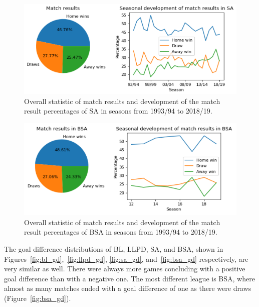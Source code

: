 \documentclass[thesis=M,english]{FITthesis}[2019/12/23]
\begin{document}
\begin{figure}[h]
    \centering
    \includegraphics[width=1\textwidth]{figures/sa_subgraph.png}
    \caption{Overall statistic of match results and development of the match result percentages of SA in seasons from 1993/94 to 2018/19.}
    \label{fig:sa_mr}
\end{figure}
\begin{figure}[h]
    \centering
    \includegraphics[width=1\textwidth]{figures/bsa_subgraph.png}
    \caption{Overall statistic of match results and development of the match result percentages of BSA in seasons from 1993/94 to 2018/19.}
    \label{fig:bsa_mr}
\end{figure}

The goal difference distributions of BL, LLPD, SA, and BSA, shown in Figures~\ref{fig:bl_gd},~\ref{fig:llpd_gd}, \ref{fig:sa_gd}, and~\ref{fig:bsa_gd} respectively, are very similar as well. There were always more games concluding with a positive goal difference than with a negative one. The most different league is BSA, where almost as many matches ended with a goal difference of one as there were draws (Figure~\ref{fig:bsa_gd}).  
\end{document}
